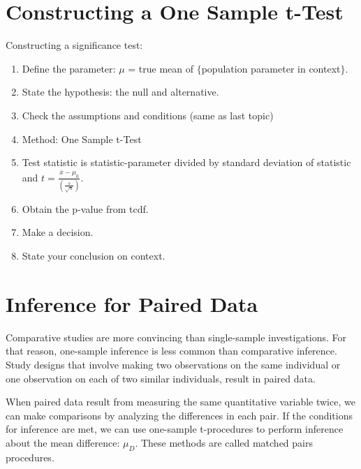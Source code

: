 \documentclass[../stats.tex]{subfiles}
\begin{document}
\section{Constructing a One Sample t-Test}
Constructing a significance test:
\begin{enumerate}
    \item Define the parameter: $\mu$ = true mean of $\{$population parameter in context$\}$.
    \item State the hypothesis: the null and alternative.
    \item Check the assumptions and conditions (same as last topic)
    \item Method: One Sample t-Test
    \item Test statistic is statistic-parameter divided by standard deviation of statistic and $t=\frac{\overline{x}-\mu_0}{\left(\frac{s}{\sqrt{n}}\right)}$.
    \item Obtain the p-value from tcdf.
    \item Make a decision.
    \item State your conclusion on context.
\end{enumerate}

\section{Inference for Paired Data}
Comparative studies are more convincing than single-sample investigations. For that reason, one-sample inference is less common than comparative inference.
Study designs that involve making two observations on the same individual or one observation on each of two similar individuals, result in paired data.

When paired data result from measuring the same quantitative variable twice, we can make comparisons by analyzing the differences in each pair. If the conditions for inference are met, we can use one-sample t-procedures to perform inference about the mean difference: $\mu_D$. These methods are called matched pairs procedures.
\end{document}

